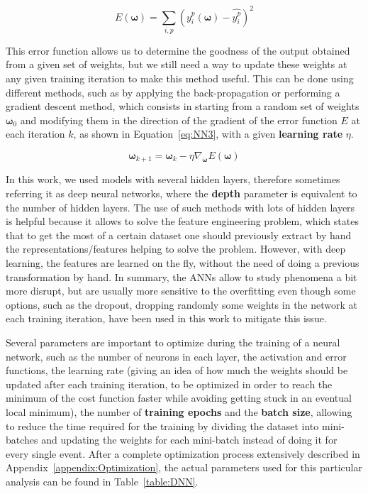 \documentclass[a4paper, 10pt, openright]{report}
\begin{document}
\begin{equation}
\label{eq:NN2}
E(\bm \omega) = \sum_{i, p} \left (y_i^p(\bm \omega) - \hat{y_i^p} \right)^2
\end{equation}

This error function allows us to determine the goodness of the output obtained from a given set of weights, but we still need a way to update these weights at any given training iteration to make this method useful. This can be done using different methods, such as by applying the back-propagation or performing a gradient descent method, which consists in starting from a random set of weights $\bm \omega_0$ and modifying them in the direction of the gradient of the error function $E$ at each iteration $k$, as shown in Equation~\ref{eq:NN3}, with a given \textbf{learning rate} $\eta$. %

\begin{equation}
\label{eq:NN3}
\bm \omega_{k+1} = \bm \omega_k - \eta \nabla_{\bm \omega} E(\bm \omega)
\end{equation}

In this work, we used models with several hidden layers, therefore sometimes referring it as deep neural networks, where the \textbf{depth} parameter is equivalent to the number of hidden layers. The use of such methods with lots of hidden layers is helpful because it allows to solve the feature engineering problem, which states that to get the most of a certain dataset one should previously extract by hand the representations/features helping to solve the problem. However, with deep learning, the features are learned on the fly, without the need of doing a previous transformation by hand. In summary, the \acp{ANN} allow to study phenomena a bit more disrupt, but are usually more sensitive to the overfitting even though some options, such as the dropout, dropping randomly some weights in the network at each training iteration, have been used in this work to mitigate this issue. 

Several parameters are important to optimize during the training of a neural network, such as the number of neurons in each layer, the activation and error functions, the learning rate (giving an idea of how much the weights should be updated after each training iteration, to be optimized in order to reach the minimum of the cost function faster while avoiding getting stuck in an eventual local minimum), the number of \textbf{training epochs} and the \textbf{batch size}, allowing to reduce the time required for the training by dividing the dataset into mini-batches and updating the weights for each mini-batch instead of doing it for every single event. After a complete optimization process extensively described in Appendix~\ref{appendix:Optimization}, the actual parameters used for this particular analysis can be found in Table~\ref{table:DNN}.
\end{document}
